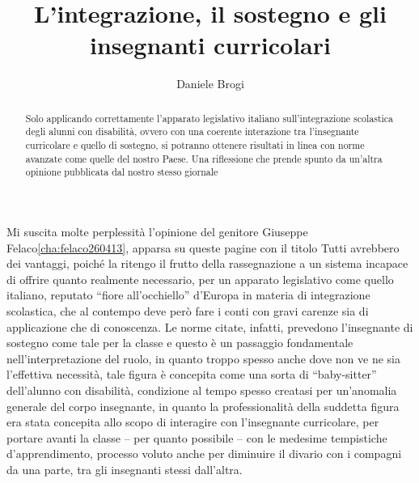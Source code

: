 \author{Daniele Brogi}
\title{L'integrazione, il sostegno e gli insegnanti curricolari}
\label{brogi260413}
\begin{abstract}
Solo applicando correttamente l'apparato legislativo italiano sull'integrazione scolastica degli alunni con disabilità, ovvero con una coerente interazione tra l'insegnante curricolare e quello di sostegno, si potranno ottenere risultati in linea con norme avanzate come quelle del nostro Paese. Una riflessione che prende spunto da un'altra opinione pubblicata dal nostro stesso giornale
\end{abstract}
\maketitle

Mi suscita molte perplessità l'opinione del genitore Giuseppe Felaco\ref{cha:felaco260413}, apparsa su queste pagine con il titolo Tutti avrebbero dei vantaggi, poiché la ritengo il frutto della rassegnazione a un sistema incapace di offrire quanto realmente necessario, per un apparato legislativo come quello italiano, reputato “fiore all'occhiello” d'Europa in materia di integrazione scolastica, che al contempo deve però fare i conti con gravi carenze sia di applicazione che di conoscenza.
Le norme citate, infatti, prevedono l'insegnante di sostegno come tale per la classe e questo è un passaggio fondamentale nell'interpretazione del ruolo, in quanto troppo spesso anche dove non ve ne sia l'effettiva necessità, tale figura è concepita come una sorta di “baby-sitter” dell'alunno con disabilità, condizione al tempo spesso creatasi per un'anomalia generale del corpo insegnante, in quanto la professionalità della suddetta figura era stata concepita allo scopo di interagire con l'insegnante curricolare, per portare avanti la classe – per quanto possibile – con le medesime tempistiche d'apprendimento, processo voluto anche per diminuire il divario con i compagni da una parte, tra gli insegnanti stessi dall'altra.

